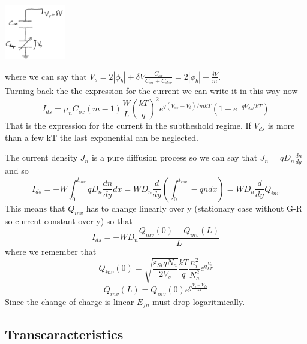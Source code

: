 \centering
\includegraphics[width=0.2\textwidth]{subth2.png}\\
\raggedright

where we can say that $V_s=2|\phi_b|+\delta V \frac{C_{ox}}{C_{ox}+C_{dep}}=2|\phi_b|+\frac{\delta V}{m}$.\\
Turning back the the expression for the current we can write it in this way now
\begin{equation}
I_{ds}=\mu_nC_{ox}(m-1)\frac{W}{L}(\frac{kT}{q})^2 e^{q(V_{gs}-V_t)/mkT}\left(1-e^{-qV_{ds}/kT}\right)
\end{equation}
That is the expression for the current in the subtheshold regime. If $V_{ds}$ is more than a few kT the last exponential can be neglected.\\

\vspace{5mm}

The current density $J_n$ is a pure diffusion process so we can say that $J_n=qD_n \frac{dn}{dy}$ and so
\begin{equation}
I_{ds}=-W\int^{t_{inv}}_0qD_n \frac{dn}{dy}dx=WD_n \frac{d}{dy}\left(\int^{t_{inv}}_0 -qndx\right)=WD_n \frac{d}{dy}Q_{inv}
\end{equation}
This means that $Q_{inv}$ has to change linearly over y (stationary case without G-R so current constant over y) so that 
\begin{equation}
I_{ds}=-WD_n \frac{Q_{inv}(0)-Q_{inv}(L)}{L}
\end{equation}
where we remember that 
\begin{equation}
Q_{inv}(0)=\sqrt{\frac{\varepsilon_{Si}qN_a}{2V_s}}	\frac{kT}{q}\frac{n_i^2}{N_a^2}e^{q\frac{V_s}{kT}}
\end{equation}
\begin{equation}
Q_{inv}(L)=Q_{inv}(0)e^{q \frac{V_s-V_{ds}}{kT}}
\end{equation}
Since the change of charge is linear $E_{fn}$ must drop logaritmically.\\


\subsection{Transcaracteristics}

